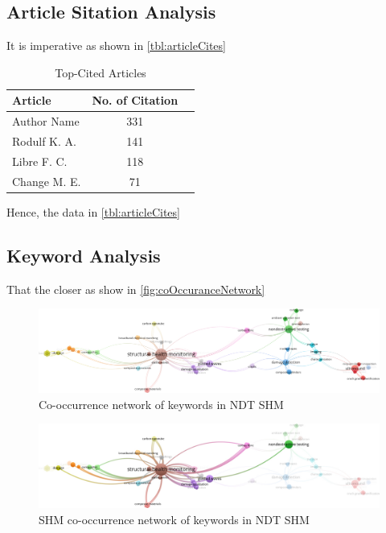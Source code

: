 \documentclass[journal, a4paper]{IEEEtran}
\begin{document}
\subsection{Article Sitation Analysis}
It is imperative as shown in \autoref{tbl:articleCites} \lipsum[1]

\begin{table}[htbp]

  \centering
  \caption{Top-Cited Articles}
  \label{tbl:articleCites}
  \begin{tabular}{lcc}

      \toprule
      \textbf{Article} & \textbf{No. of Citation} \\
      \midrule
      Author Name       \cite{}           &    331         \\
      Rodulf K. A.      \cite{}      &    141         \\
      Libre F. C.       \cite{}     &    118         \\
      Change M. E.      \cite{}          &    71          \\
      \bottomrule
  \end{tabular}
\end{table}

Hence, the data in \autoref{tbl:articleCites} \lipsum[1]



\subsection{Keyword Analysis}
That the closer as show in \autoref{fig:coOccuranceNetwork} \lipsum[1]

\begin{figure}[h] %
  \centering
  \includegraphics[width=\textwidth]{./word_cloud/filtered/co_occurance_network.jpg}
  \caption{Co-occurrence network of keywords in NDT SHM}
  \label{fig:coOccuranceNetwork}
\end{figure}

\begin{figure}[h] %
  \centering
  \includegraphics[width=\textwidth]{./word_cloud/filtered/co_occurance_network_shm.jpg}
  \caption{SHM co-occurrence network of keywords in NDT SHM}
  \label{fig:coOccuranceNetworkSHM}
\end{figure}
\end{document}
